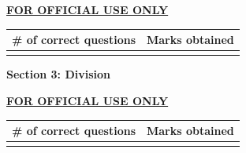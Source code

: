 \documentclass[11pt]{article}
\begin{document}


\clearpage
\vspace{0.2in}


\begin{center}
\vspace{0.4in}
\underline{\large\textbf{FOR OFFICIAL USE ONLY}}

\begin{table}[h]
\centering
\begin{tabular}{|c|c|}
    \hline \# of correct questions & Marks obtained \\
    \hline  &  \\ [3ex]
    \hline
\end{tabular}
\end{table}
\end{center}

\clearpage
\vspace{0.2 in}
\begin{center}
{\bf \Large{Section 3: Division}}
\end{center}
\vspace{0.1in}


\clearpage
\vspace{0.2in}


\begin{center}
\vspace{0.4in}
\underline{\large\textbf{FOR OFFICIAL USE ONLY}}

\begin{table}[h]
\centering
\begin{tabular}{|c|c|}
    \hline \# of correct questions & Marks obtained \\
    \hline  &  \\ [3ex]
    \hline
\end{tabular}
\end{table}
\end{center}


\end{document}
